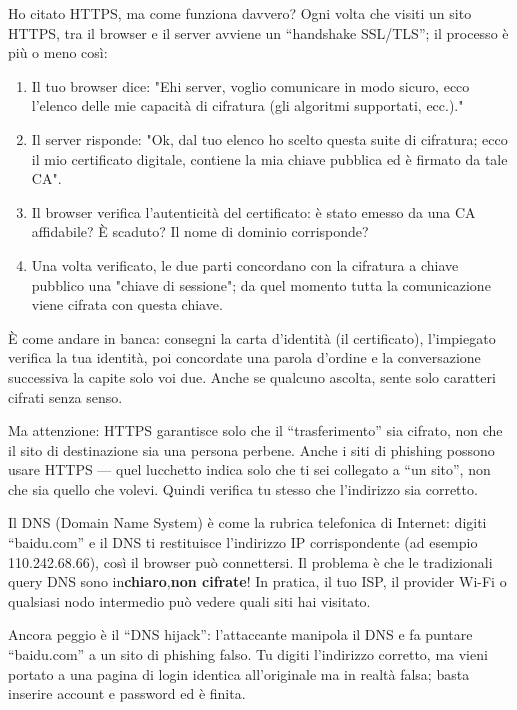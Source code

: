 
Ho citato HTTPS, ma come funziona davvero? Ogni volta che visiti un sito HTTPS, tra il browser e il server avviene un “handshake SSL/TLS”; il processo è più o meno così:

\begin{enumerate}
  \item Il tuo browser dice: "Ehi server, voglio comunicare in modo sicuro, ecco l'elenco delle mie capacità di cifratura (gli algoritmi supportati, ecc.)."
  \item Il server risponde: "Ok, dal tuo elenco ho scelto questa suite di cifratura; ecco il mio certificato digitale, contiene la mia chiave pubblica ed è firmato da tale CA".
  \item Il browser verifica l'autenticità del certificato: è stato emesso da una CA affidabile? È scaduto? Il nome di dominio corrisponde?
  \item Una volta verificato, le due parti concordano con la cifratura a chiave pubblico una "chiave di sessione"; da quel momento tutta la comunicazione viene cifrata con questa chiave.
\end{enumerate}

È come andare in banca: consegni la carta d'identità (il certificato), l'impiegato verifica la tua identità, poi concordate una parola d'ordine e la conversazione successiva la capite solo voi due. Anche se qualcuno ascolta, sente solo caratteri cifrati senza senso.

Ma attenzione: HTTPS garantisce solo che il “trasferimento” sia cifrato, non che il sito di destinazione sia una persona perbene. Anche i siti di phishing possono usare HTTPS — quel lucchetto indica solo che ti sei collegato a “un sito”, non che sia quello che volevi. Quindi verifica tu stesso che l'indirizzo sia corretto.


Il DNS (Domain Name System) è come la rubrica telefonica di Internet: digiti “baidu.com” e il DNS ti restituisce l'indirizzo IP corrispondente (ad esempio 110.242.68.66), così il browser può connettersi. Il problema è che le tradizionali query DNS sono in\textbf{chiaro},\textbf{non cifrate}! In pratica, il tuo ISP, il provider Wi-Fi o qualsiasi nodo intermedio può vedere quali siti hai visitato.

Ancora peggio è il “DNS hijack”: l'attaccante manipola il DNS e fa puntare “baidu.com” a un sito di phishing falso. Tu digiti l'indirizzo corretto, ma vieni portato a una pagina di login identica all'originale ma in realtà falsa; basta inserire account e password ed è finita.


